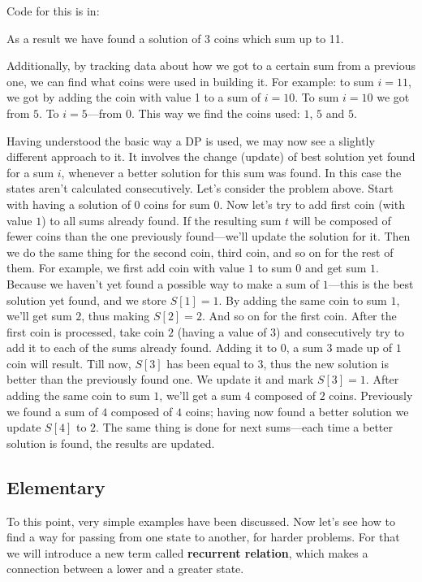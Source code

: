 Code for this is in:\\

As a result we have found a solution of 3 coins which sum up to 11.

Additionally, by tracking data about how we got to a certain sum from a
previous one, we can find what coins were used in building it. For example:
to sum $i=11$, we got by adding the coin with value 1 to a sum of $i=10$. To
sum $i=10$ we got from $5$. To $i=5$---from $0$. This way we find the coins
used: $1$, $5$ and $5$.

Having understood the basic way a DP is used, we may now see a slightly
different approach to it. It involves the change (update) of best solution
yet found for a sum $i$, whenever a better solution for this sum was found.
In this case the states aren't calculated consecutively. Let's consider the
problem above. Start with having a solution of $0$ coins for sum $0$. Now
let's try to add first coin (with value $1$) to all sums already found. If
the resulting sum $t$ will be composed of fewer coins than the one
previously found---we'll update the solution for it. Then we do the same
thing for the second coin, third coin, and so on for the rest of them. For
example, we first add coin with value $1$ to sum $0$ and get sum $1$.
Because we haven't yet found a possible way to make a sum of $1$---this is
the best solution yet found, and we store $S[1]=1$. By adding the same coin
to sum $1$, we'll get sum $2$, thus making $S[2]=2$. And so on for the first
coin. After the first coin is processed, take coin $2$ (having a value of
$3$) and consecutively try to add it to each of the sums already found.
Adding it to $0$, a sum $3$ made up of $1$ coin will result. Till now,
$S[3]$ has been equal to $3$, thus the new solution is better than the
previously found one. We update it and mark $S[3]=1$. After adding the same
coin to sum $1$, we'll get a sum $4$ composed of $2$ coins. Previously we
found a sum of $4$ composed of $4$ coins; having now found a better solution
we update $S[4]$ to $2$. The same thing is done for next sums---each time a
better solution is found, the results are updated.

\subsection{Elementary
  \label{subsecDPElementary}}

To this point, very simple examples have been discussed. Now let's see how
to find a way for passing from one state to another, for harder problems.
For that we will introduce a new term called \textbf{recurrent relation},
which makes a connection between a lower and a greater state.


